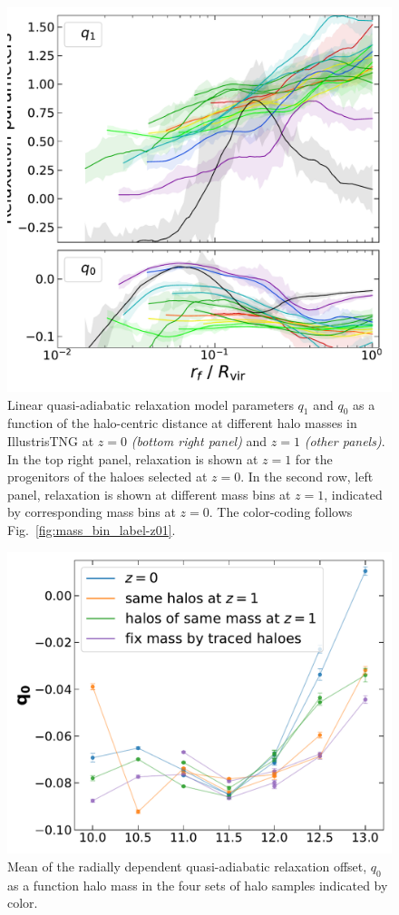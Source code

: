 \begin{figure}[htbp]
\includegraphics[width=0.48\linewidth,trim={0.5cm 0 0 0},clip]{plots/fit_params_rf_M_T_snap098.pdf}
\caption{Linear quasi-adiabatic relaxation model parameters $q_1$ and $q_0$ as a function of the halo-centric distance at different halo masses in IllustrisTNG at $z=0$ \emph{(bottom right panel)} and $z=1$ \emph{(other panels)}. In the top right panel, relaxation is shown at $z=1$ for the progenitors of the haloes selected at $z=0$. In the second row, left panel, relaxation is shown at different mass bins at $z=1$, indicated by corresponding mass bins at $z=0$. The color-coding follows Fig.~\ref{fig:mass_bin_label-z01}.}
\label{fig:rf-fit-params}
\end{figure}

\begin{figure}[htbp]
\centering
\includegraphics[width=0.6\linewidth]{plots/fit_param_q0_M_T_z01.pdf}
\caption{Mean of the radially dependent quasi-adiabatic relaxation offset, $q_{0}$ as a function halo mass in the four sets of halo samples indicated by color.}
\label{fig:fit-fit-func-q}
\end{figure}










